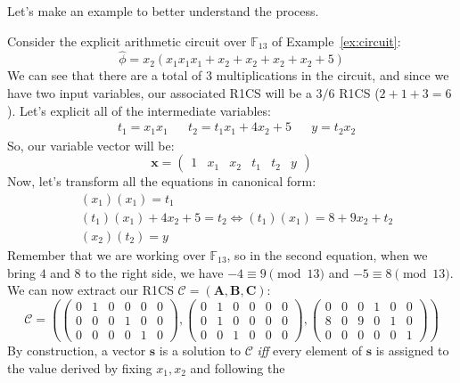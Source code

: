 \noindent Let's make an example to better understand the process.
\begin{example}\label{ex:r1cs}
	Consider the explicit arithmetic circuit over \(\mathbb{F}_{13}\) of Example~\ref{ex:circuit}:
	\[\widehat{\phi} = x_2(x_1x_1x_1 + x_2 + x_2 + x_2 + x_2 + 5)\]
	We can see that there are a total of 3 multiplications in the circuit, and since we have two input
	variables, our associated R1CS will be a \(3/6\) R1CS (\(2+1+3 = 6\)).
	Let's explicit all of the intermediate variables:
	\begin{align*}
		 & t_1 = x_1x_1 &  & t_2 = t_1x_1 + 4x_2 + 5 &  & y = t_2x_2
	\end{align*}
	So, our variable vector will be:
	\[\bm{x} = \begin{pmatrix}1 & x_1 & x_2 & t_1 & t_2 & y\end{pmatrix}\]
	Now, let's transform all the equations in canonical form:
	\begin{align*}
		 & (x_1)(x_1) = t_1                                                 \\
		 & {(t_1)(x_1) + 4x_2 + 5 = t_2} \iff {(t_1)(x_1) = 8 + 9x_2 + t_2} \\
		 & (x_2)(t_2) = y
	\end{align*}
	Remember that we are working over \(\mathbb{F}_{13}\), so in the second equation, when we bring
	\(4\) and \(8\) to the right side, we have \(-4 \equiv 9 \pmod{13}\) and \(-5 \equiv 8 \pmod{13}\).
	We can now extract our R1CS \(\mathcal{C} = (\bm{A}, \bm{B}, \bm{C})\):
	\[
		\mathcal{C} =
		\left(
		\begin{pmatrix}
				0 & 1 & 0 & 0 & 0 & 0 \\
				0 & 0 & 0 & 1 & 0 & 0 \\
				0 & 0 & 0 & 0 & 1 & 0
			\end{pmatrix},
		\begin{pmatrix}
				0 & 1 & 0 & 0 & 0 & 0 \\
				0 & 1 & 0 & 0 & 0 & 0 \\
				0 & 0 & 1 & 0 & 0 & 0
			\end{pmatrix},
		\begin{pmatrix}
				0 & 0 & 0 & 1 & 0 & 0 \\
				8 & 0 & 9 & 0 & 1 & 0 \\
				0 & 0 & 0 & 0 & 0 & 1
			\end{pmatrix}
		\right)
	\]
	By construction, a vector \(\bm{s}\) is a solution to \(\mathcal{C}\) \emph{iff} every element
	of \(\bm{s}\) is assigned to the value derived by fixing \(x_1, x_2\) and following the

\end{example}
